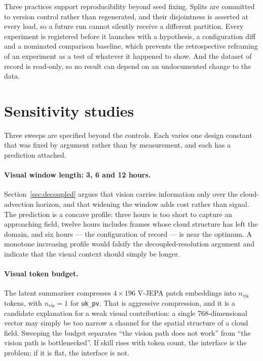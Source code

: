 Three practices support reproducibility beyond seed fixing. Splits are committed to version
control rather than regenerated, and their disjointness is asserted at every load, so a
future run cannot silently receive a different partition. Every experiment is registered
before it launches with a hypothesis, a configuration diff and a nominated comparison
baseline, which prevents the retrospective reframing of an experiment as a test of whatever
it happened to show. And the dataset of record is read-only, so no result can depend on an
undocumented change to the data.

\section{Sensitivity studies}
\label{sec:sensitivity}

Three sweeps are specified beyond the controls. Each varies one design constant that was
fixed by argument rather than by measurement, and each has a prediction attached.

\paragraph{Visual window length: 3, 6 and 12 hours.} Section~\ref{sec:decoupled} argues that
vision carries information only over the cloud-advection horizon, and that widening the
window adds cost rather than signal. The prediction is a concave profile: three hours is too
short to capture an approaching field, twelve hours includes frames whose cloud structure has
left the domain, and six hours --- the configuration of record --- is near the optimum. A
monotone increasing profile would falsify the decoupled-resolution argument and indicate that
the visual context should simply be longer.

\paragraph{Visual token budget.} The latent summariser compresses $4 \times 196$ V-JEPA
patch embeddings into $n_{\text{vis}}$ tokens, with $n_{\text{vis}}=1$ for \texttt{uk\_pv}.
That is aggressive compression, and it is a candidate explanation for a weak visual
contribution: a single 768-dimensional vector may simply be too narrow a channel for the
spatial structure of a cloud field. Sweeping the budget separates ``the vision path does not
work'' from ``the vision path is bottlenecked''. If skill rises with token count, the
interface is the problem; if it is flat, the interface is not.

